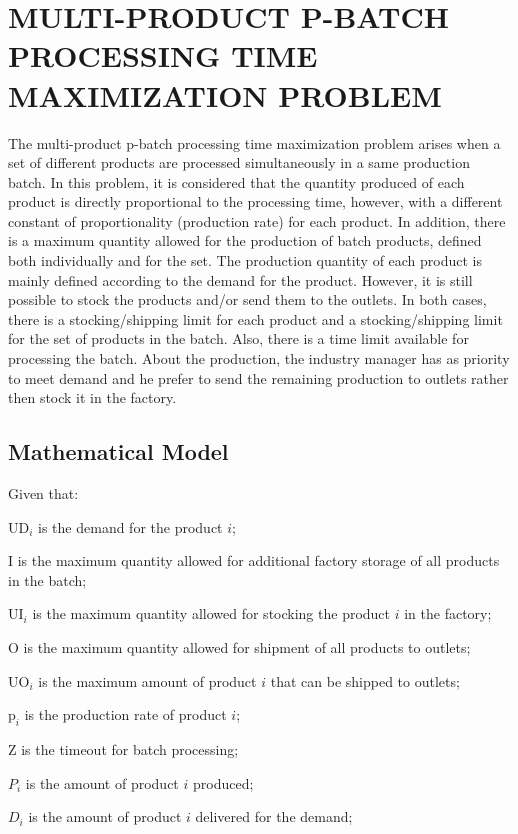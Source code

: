 \documentclass[10pt,fleqn,a4paper,twoside]{article}
\begin{document}
\section{MULTI-PRODUCT P-BATCH PROCESSING TIME MAXIMIZATION PROBLEM}
\label{sec:MBPTMP}

The multi-product p-batch processing time maximization problem arises when a set of different products are processed simultaneously in a same production batch. In this problem, it is considered that the quantity produced of each product is directly proportional to the processing time, however, with a different constant of proportionality (production rate) for each product. In addition, there is a maximum quantity allowed for the production of batch products, defined both individually and for the set. The production quantity of each product is mainly defined according to the demand for the product. However, it is still possible to stock the products and/or send them to the outlets. In both cases, there is a stocking/shipping limit for each product and a stocking/shipping limit for the set of products in the batch. Also, there is a time limit available for processing the batch. About the production, the industry manager has as priority to meet demand and he prefer to send the remaining production to outlets rather then stock it in the factory. 

\subsection{Mathematical Model}
\label{sec:mathModel}

Given that:

$\textrm{UD}_i$ is the demand for the product $i$;

$\textrm{I}$ is the maximum quantity allowed for additional factory storage of all products in the batch;

$\textrm{UI}_i$ is the maximum quantity allowed for stocking the product $i$ in the factory;

$\textrm{O}$ is the maximum quantity allowed for shipment of all products to outlets;

$\textrm{UO}_i$ is the maximum amount of product $i$ that can be shipped to outlets;

$\textrm{p}_i$ is the production rate of product $i$;

$\textrm{Z}$ is the timeout for batch processing;

$P_i$ is the amount of product $i$ produced;

$D_i$ is the amount of product $i$ delivered for the demand;
\end{document}
